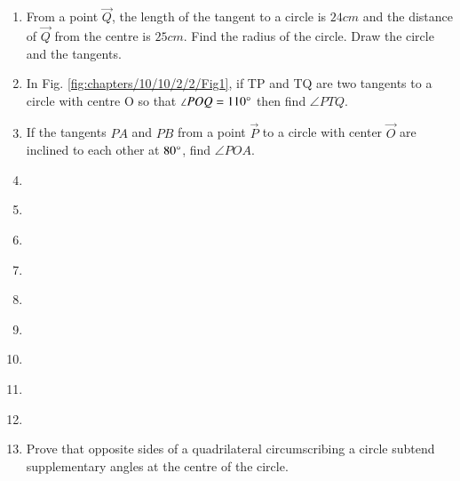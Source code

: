 \begin{enumerate}[label=\thesection.\arabic*,ref=\thesection.\theenumi]
\item From a point $\vec{Q}$, the length of the tangent to a circle is $24 cm$ and the distance of $\vec{Q}$ from the centre is $25 cm$. Find the radius of the circle. Draw the circle and the tangents. 
\label{chapters/10/10/2/1}
\\
\solution

\item In Fig. \ref{fig:chapters/10/10/2/2/Fig1}, if TP and TQ are two tangents to a circle with centre O so that $\angle{POQ} = 110\degree$ then find $\angle{PTQ}$. 
\\
\solution

\item If the tangents $PA$ and $PB$ from a point $\vec{P}$ to a circle with center $\vec{O}$ are inclined to each other at $80{\degree}$, find $\angle{POA}$.
\\
\solution

\item 
\label{chapters/10/10/2/4}

\item 
\label{chapters/10/10/2/5}
%
\item 
\label{chapters/10/10/2/6}

\item 
\label{chapters/10/10/2/7}

\item 
\label{chapters/10/10/2/8}

\item 
\label{chapters/10/10/2/9}

\item 
\label{chapters/10/10/2/10}

\item 
%
\item 
\label{chapters/10/10/2/12}

 \item Prove that opposite sides of a quadrilateral circumscribing a circle 
    subtend supplementary angles at the centre of the circle.
\label{chapters/10/10/2/13}
\\
       \solution 


\end{enumerate}
